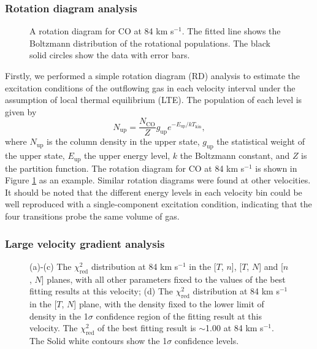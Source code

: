 \subsubsection{Rotation diagram analysis\label{subsec:RD}}

\begin{figure}[tbp]
\caption{A rotation diagram for CO at 84 km s$^{-1}$.  The fitted line shows the Boltzmann distribution of the rotational populations. The black solid circles show the data with error bars. \label{fig:figrd}}
\end{figure}

Firstly, we performed a simple rotation diagram (RD) analysis \citep{1999ApJ...517..209G} to estimate the excitation conditions of the outflowing gas in each velocity interval under the assumption of local thermal equilibrium (LTE). The population of each level is given by 
\begin{equation}
N_{\mathrm{up}} = \frac{N_\mathrm{CO}}{Z} g_\mathrm{up} e^{-E_\mathrm{up}/kT_\mathrm{kin}},
\end{equation}
where $N_\mathrm{up}$ is the column density in the upper state, $g_\mathrm{up}$ the statistical weight of the upper state, $E_\mathrm{up}$ the upper energy level, $k$ the Boltzmann constant, and $Z$ is the partition function.
The rotation diagram for CO at 84 km s$^{-1}$ is shown in Figure \ref{fig:figrd} as an example. Similar rotation diagrams were found at other velocities. It should be noted that the different energy levels in each velocity bin could be well reproduced with a single-component excitation condition, indicating that the four transitions probe the same volume of gas.  

\subsubsection{Large velocity gradient analysis\label{subsec:LVG}}

\begin{figure}[!tbp]
\caption{(a)-(c) The $\chi^2_{\mathrm{red}}$ distribution at 84 km s$^{-1}$ in the [$T$, $n$], [$T$, $N$] and [$n$, $N$] planes, with all other parameters fixed to the values of the best fitting results at this velocity; (d) The $\chi^2_{\mathrm{red}}$ distribution at 84 km s$^{-1}$ in the [$T$, $N$] plane, with the density fixed to the lower limit of density in the 1$\sigma$ confidence region of the fitting result at this velocity. The $\chi^2_{\mathrm{red}}$ of the best fitting result is $\sim$1.00 at 84 km s$^{-1}$. The Solid white contours show the 1$\sigma$ confidence levels. \label{fig:figchi}}
\end{figure}

